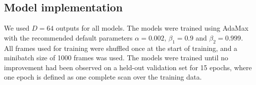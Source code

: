 

\subsection{Model implementation}

We used $D = 64$ outputs for all models.
The models were trained using AdaMax \parencite{kingma2014adam} with the recommended default parameters $\alpha = 0.002$, $\beta_1 = 0.9$ and $\beta_2 = 0.999$.
All frames used for training were shuffled once at the start of training, and a minibatch size of 1000 frames was used.
The models were trained until no improvement had been observed on a held-out validation set for 15 epochs, where one epoch is defined as one complete scan over the training data.


